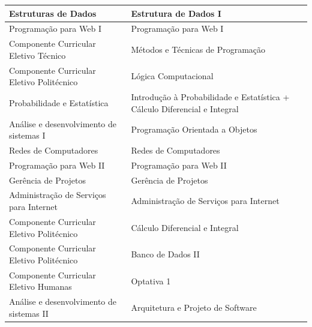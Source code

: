 \documentclass[11pt,fleqn]{book} %
\begin{document}
\begin{table}[H]
{\begin{tabular}{|l|l|}
			Estruturas de Dados                       & Estrutura de Dados I                                                                             \\ \hline
			Programação para Web I                    & Programação para Web I                                                                           \\ \hline
			Componente Curricular Eletivo Técnico     & Métodos e Técnicas de Programação                                                                \\ \hline
			Componente Curricular Eletivo Politécnico & Lógica Computacional                                                                             \\ \hline
			Probabilidade e Estatística               & Introdução à Probabilidade e Estatística + Cálculo Diferencial e Integral                        \\ \hline
			Análise e desenvolvimento de sistemas I   & Programação Orientada a Objetos                                                                  \\ \hline
			Redes de Computadores                     & Redes de Computadores                                                                            \\ \hline
			Programação para Web II                   & Programação para Web II                                                                          \\ \hline
			Gerência de Projetos                      & Gerência de Projetos                                                                             \\ \hline
			Administração de Serviços para Internet   & Administração de Serviços para Internet                                                          \\ \hline
			Componente Curricular Eletivo Politécnico & Cálculo Diferencial e Integral                                                                   \\ \hline
			Componente Curricular Eletivo Politécnico & Banco de Dados II                                                                                \\ \hline
			Componente Curricular Eletivo Humanas     & Optativa 1                                                                                       \\ \hline
			Análise e desenvolvimento de sistemas II  & Arquitetura e Projeto de Software                                                                \\ \hline

\end{tabular}}
\end{table}
\end{document}
